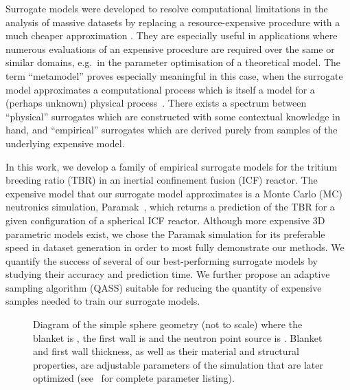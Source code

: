 Surrogate models were developed to resolve computational limitations in the analysis of massive datasets by replacing a resource-expensive procedure with a much cheaper approximation
\cite{Sondergaard2003}. They are especially useful in applications where
numerous evaluations of an expensive procedure are required over the same or
similar domains, e.g.~in the parameter optimisation of a theoretical model. The
term ``metamodel'' proves especially meaningful in this case, when the surrogate
model approximates a computational process which is itself a model for a
(perhaps unknown) physical process~\cite{Myers2002}. There exists a spectrum
between ``physical'' surrogates which are constructed with some contextual
knowledge in hand, and ``empirical'' surrogates which are derived purely from
samples of the underlying expensive model.

In this work, we develop a family of empirical surrogate models for the tritium breeding
ratio (TBR) in an inertial confinement fusion (ICF) reactor. The expensive model
that our surrogate model approximates is a Monte Carlo (MC) neutronics
simulation, Paramak~\cite{paramak}, which returns a prediction of the TBR for a given
configuration of a spherical ICF reactor. Although more expensive 3D parametric models exist, we chose the Paramak simulation for its preferable speed in dataset generation in order to most fully demonstrate our methods. We quantify the success of several of our best-performing surrogate models by studying their accuracy and prediction time. We further propose an adaptive sampling algorithm (QASS) suitable for reducing the quantity of expensive samples needed to train our surrogate models.

\begin{figure}[!ht]
  \centering

    \caption{Diagram of the simple sphere geometry (not to scale) where the
	blanket is , the
first wall is  and the
neutron point source is .
Blanket and first wall thickness, as well as their material and structural
properties, are adjustable parameters of the simulation that are later optimized
(see~ for complete parameter listing).}
    \label{fig:model_diagram}
\end{figure}

